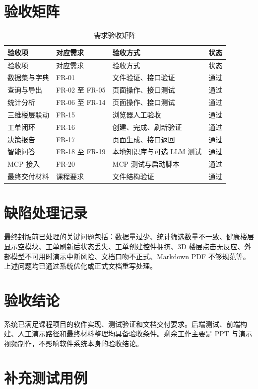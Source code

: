 \documentclass[12pt,a4paper]{ctexart}
\begin{document}
\section{验收矩阵}
\begin{longtable}{p{4cm}p{3.5cm}p{3.5cm}p{2.2cm}}
\caption{需求验收矩阵}\\
\toprule
验收项 & 对应需求 & 验收方式 & 状态 \\
\midrule
\endfirsthead
\toprule
验收项 & 对应需求 & 验收方式 & 状态 \\
\midrule
\endhead
数据集与字典 & FR-01 & 文件验证、接口验证 & 通过 \\
查询与导出 & FR-02 至 FR-05 & 页面操作、接口测试 & 通过 \\
统计分析 & FR-06 至 FR-14 & 页面操作、接口测试 & 通过 \\
三维楼层联动 & FR-15 & 浏览器人工验收 & 通过 \\
工单闭环 & FR-16 & 创建、完成、刷新验证 & 通过 \\
决策报告 & FR-17 & 页面生成、接口返回 & 通过 \\
智能问答 & FR-18 至 FR-19 & 本地知识库与可选 LLM 测试 & 通过 \\
MCP 接入 & FR-20 & MCP 测试与启动脚本 & 通过 \\
最终交付材料 & 课程要求 & 文件结构验证 & 通过 \\
\bottomrule
\end{longtable}

\section{缺陷处理记录}
最终封版前已处理的关键问题包括：数据量过少、统计筛选数量不一致、健康楼层显示空模块、工单刷新后状态丢失、工单创建控件拥挤、3D 楼层点击无反应、外部模型不可用时演示中断风险、文档口吻不正式、Markdown PDF 不够规范等。上述问题均已通过系统优化或正式文档重写处理。

\section{验收结论}
系统已满足课程项目的软件实现、测试验证和文档交付要求。后端测试、前端构建、人工演示路径和最终材料整理均具备验收条件。剩余工作主要是 PPT 与演示视频制作，不影响软件系统本身的验收结论。

\clearpage
\section{补充测试用例}
\end{document}
